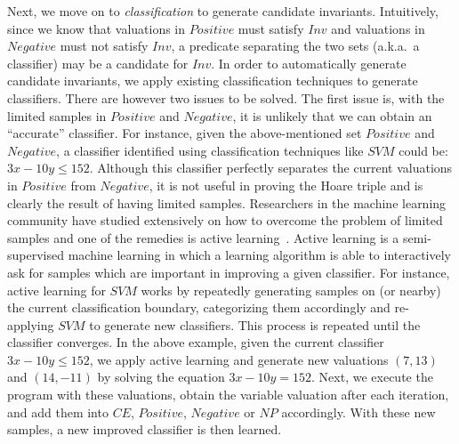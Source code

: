 Next, we move on to \emph{classification} to generate candidate invariants.
Intuitively, since we know that valuations in $Positive$ must satisfy $Inv$ and valuations in $Negative$ must not satisfy $Inv$,
a predicate separating the two sets (a.k.a.~a classifier) may be a candidate for $\mathit{Inv}$. In order to automatically generate candidate invariants, we apply existing classification techniques to generate classifiers.
There are however two issues to be solved.
The first issue is, with the limited samples in $Positive$ and $Negative$,
it is unlikely that we can obtain an ``accurate'' classifier.
For instance, given the above-mentioned set $Positive$ and $Negative$,
a classifier identified using classification techniques like $SVM$ could be: $3x-10y \leq 152$. %
Although this classifier perfectly separates the current valuations in $Positive$ from $Negative$,
it is not useful in proving the Hoare triple and is clearly the result of having limited samples.
Researchers in the machine learning community have studied extensively on how to overcome the problem of limited samples and one of the remedies is active learning~\cite{DBLP:series/synthesis/2012Settles}.
Active learning is a semi-supervised machine learning in which a learning algorithm is able to interactively ask for samples which are important in improving a given classifier.
For instance, active learning for $SVM$ works by repeatedly generating samples on (or nearby) the current classification boundary,
categorizing them accordingly and re-applying $SVM$ to generate new classifiers.
This process is repeated until the classifier converges.
%
In the above example, given the current classifier $3x-10y \leq 152$, we apply active learning
and generate new valuations $(7, 13)$ and $(14, -11)$ %
by solving the equation $3x-10y = 152$. %
Next, we execute the program with these valuations,
obtain the variable valuation after each iteration, and add them into $\mathit{CE}$, $\mathit{Positive}$, $\mathit{Negative}$ or $\mathit{NP}$ accordingly.
With these new samples, a new improved classifier is then learned.

